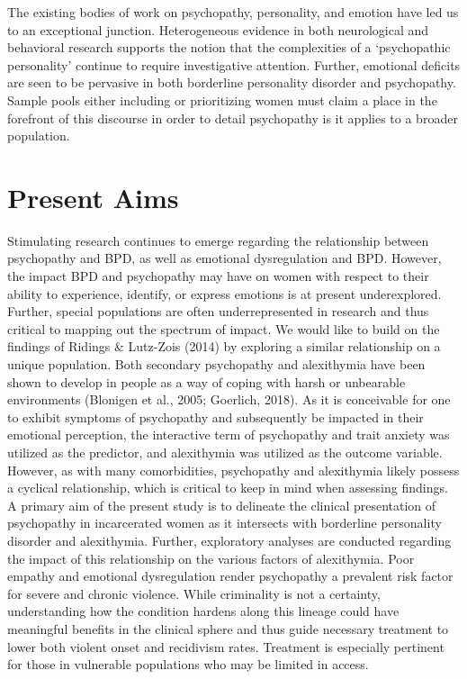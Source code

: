 \documentclass[
  man,floatsintext]{apa7}
\begin{document}
The existing bodies of work on psychopathy, personality, and emotion have led us to an exceptional junction. Heterogeneous evidence in both neurological and behavioral research supports the notion that the complexities of a `psychopathic personality' continue to require investigative attention. Further, emotional deficits are seen to be pervasive in both borderline personality disorder and psychopathy. Sample pools either including or prioritizing women must claim a place in the forefront of this discourse in order to detail psychopathy is it applies to a broader population.

\hypertarget{present-aims}{%
\section{Present Aims}\label{present-aims}}

Stimulating research continues to emerge regarding the relationship between psychopathy and BPD, as well as emotional dysregulation and BPD. However, the impact BPD and psychopathy may have on women with respect to their ability to experience, identify, or express emotions is at present underexplored. Further, special populations are often underrepresented in research and thus critical to mapping out the spectrum of impact. We would like to build on the findings of Ridings \& Lutz-Zois (2014) by exploring a similar relationship on a unique population. Both secondary psychopathy and alexithymia have been shown to develop in people as a way of coping with harsh or unbearable environments (Blonigen et al., 2005; Goerlich, 2018). As it is conceivable for one to exhibit symptoms of psychopathy and subsequently be impacted in their emotional perception, the interactive term of psychopathy and trait anxiety was utilized as the predictor, and alexithymia was utilized as the outcome variable. However, as with many comorbidities, psychopathy and alexithymia likely possess a cyclical relationship, which is critical to keep in mind when assessing findings. A primary aim of the present study is to delineate the clinical presentation of psychopathy in incarcerated women as it intersects with borderline personality disorder and alexithymia. Further, exploratory analyses are conducted regarding the impact of this relationship on the various factors of alexithymia. Poor empathy and emotional dysregulation render psychopathy a prevalent risk factor for severe and chronic violence. While criminality is not a certainty, understanding how the condition hardens along this lineage could have meaningful benefits in the clinical sphere and thus guide necessary treatment to lower both violent onset and recidivism rates. Treatment is especially pertinent for those in vulnerable populations who may be limited in access.
\end{document}
